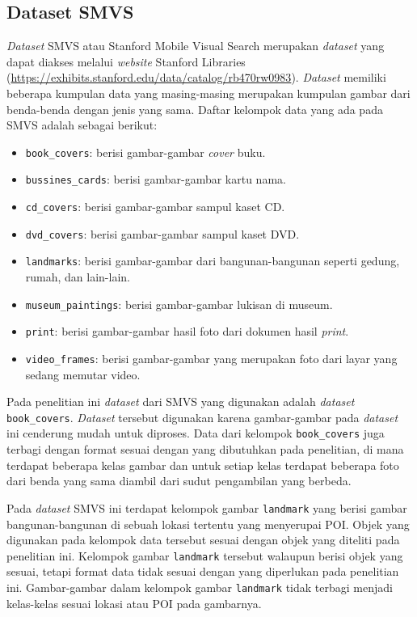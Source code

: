 \subsection{Dataset SMVS}
\label{subsec:dataset_smvs}
\textit{Dataset} SMVS atau Stanford Mobile Visual Search merupakan \textit{dataset} yang dapat diakses melalui \textit{website} Stanford Libraries (\url{https://exhibits.stanford.edu/data/catalog/rb470rw0983}). \textit{Dataset} memiliki beberapa kumpulan data yang masing-masing merupakan kumpulan gambar dari benda-benda dengan jenis yang sama. Daftar kelompok data yang ada pada SMVS adalah sebagai berikut:
\begin{itemize}
	\item \texttt{book\_covers}: berisi gambar-gambar \textit{cover} buku.
	\item \texttt{bussines\_cards}: berisi gambar-gambar kartu nama.
	\item \texttt{cd\_covers}: berisi gambar-gambar sampul kaset CD.
	\item \texttt{dvd\_covers}: berisi gambar-gambar sampul kaset DVD.
	\item \texttt{landmarks}: berisi gambar-gambar dari bangunan-bangunan seperti gedung, rumah, dan lain-lain.
	\item \texttt{museum\_paintings}: berisi gambar-gambar lukisan di museum.
	\item \texttt{print}: berisi gambar-gambar hasil foto dari dokumen hasil \textit{print}.
	\item \texttt{video\_frames}: berisi gambar-gambar yang merupakan foto dari layar yang sedang memutar video.
\end{itemize}
Pada penelitian ini \textit{dataset} dari SMVS yang digunakan adalah \textit{dataset} \texttt{book\_covers}. \textit{Dataset} tersebut digunakan karena gambar-gambar pada \textit{dataset} ini cenderung mudah untuk diproses. Data dari kelompok \texttt{book\_covers} juga terbagi dengan format sesuai dengan yang dibutuhkan pada penelitian, di mana terdapat beberapa kelas gambar dan untuk setiap kelas terdapat beberapa foto dari benda yang sama diambil dari sudut pengambilan yang berbeda. 

Pada \textit{dataset} SMVS ini terdapat kelompok gambar \texttt{landmark} yang berisi gambar bangunan-bangunan di sebuah lokasi tertentu yang menyerupai POI. Objek yang digunakan pada kelompok data tersebut sesuai dengan objek yang diteliti pada penelitian ini. Kelompok gambar \texttt{landmark} tersebut walaupun berisi objek yang sesuai, tetapi format data tidak sesuai dengan yang diperlukan pada penelitian ini. Gambar-gambar dalam kelompok gambar \texttt{landmark} tidak terbagi menjadi kelas-kelas sesuai lokasi atau POI pada gambarnya.

